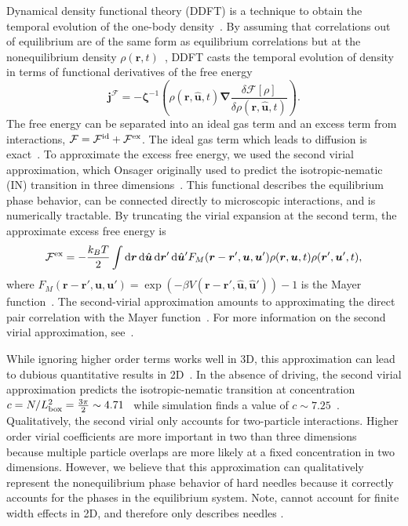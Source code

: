 Dynamical density functional theory (DDFT) is a technique to obtain the temporal
evolution of the one-body density~\cite{marconi_dynamic_99, marconi_dynamic_00,
  archer_dynamical_04}.  By assuming that correlations out of equilibrium are of
the same form as equilibrium correlations but at the nonequilibrium density
$\rho(\bm{r},t)$~\cite{archer_dynamical_04}, DDFT casts the temporal evolution
of density in terms of functional derivatives of the free energy
%
\begin{equation}
  \bm{j} ^ {\mathcal{F}} = 
  -\bm{\zeta}^{-1} \left(\rho( \bm{r}, \hat{\bm{u}}, t )
  \bm{\nabla} \frac{\delta \mathcal{F}[ \rho ]}
  {\delta \rho( \bm{r}, \hat{\bm{u}}, t ) } \right).
\end{equation}
%
The free energy can be separated into an ideal gas term and an
excess term from interactions, $\mathcal{F} = \mathcal{F}^{\mathrm{id}} +
\mathcal{F}^{\mathrm{ex}}$. The ideal gas term which leads to diffusion is
exact~\cite{hansen_theory_06}.  To approximate the excess free energy, we used
the second virial approximation, which Onsager originally used to 
predict the isotropic-nematic (IN) transition in three
dimensions~\cite{onsager_effects_49}.  This functional 
describes the equilibrium phase behavior, can be connected directly to
microscopic interactions, and is numerically tractable.  By truncating the
virial expansion at the second term, the approximate excess free energy is
%
\begin{equation}
  \label{eqn:mayer}
  \mathcal{F}^{\mathrm{ex}} = - \frac{k_B T}{2} \int 
  \mathop{}\!\mathrm{d} \bm{r} \mathop{}\!\mathrm{d} \hat{\bm{u}} \mathop{}\!\mathrm{d} \bm{r}' \mathop{}\!\mathrm{d} \hat{\bm{u}}'
  F_{M}(\bm{r}-\bm{r}',\bm{u},\bm{u}') 
  \rho(\bm{r},\bm{u},t) \rho(\bm{r}',\bm{u}',t) ,
\end{equation}
%
where $ F_{M}(\bm{r}-\bm{r}',\bm{u},\bm{u}') =  \exp(-\beta V(\bm{r} -
\bm{r}',\hat{ \bm{u} }, \hat{ \bm{u} }') )- 1 $ is the Mayer
function~\cite{hansen_theory_06}.  The second-virial approximation amounts to
approximating the direct pair correlation with the Mayer
function~\cite{hansen_theory_06}.  For more information on the second virial
approximation, see~.

While ignoring higher order terms works well in 3D, this approximation can lead
to dubious quantitative results in 2D~\cite{kayser_bifurcation_78,
  frenkel_evidence_85}.  In the absence of driving, the second virial
approximation predicts the isotropic-nematic transition at concentration
$c=N/L_{\mathrm{box}}^2 =\frac{3 \pi}{2} \sim 4.71$~\cite{kayser_bifurcation_78}
while simulation finds a value of $c \sim 7.25 $~\cite{frenkel_evidence_85,
  bates_phase_00}.   Qualitatively, the second virial only
accounts for two-particle interactions.  Higher order virial coefficients are
more important in two than three dimensions~\cite{frenkel_evidence_85} because
multiple particle overlaps are more likely at a fixed concentration in two
dimensions.  
However, we believe that this approximation can qualitatively
represent the nonequilibrium phase behavior of hard needles because it correctly
accounts for the phases in the equilibrium system.  Note, 
cannot account for finite width effects in 2D, and therefore only describes needles
.

